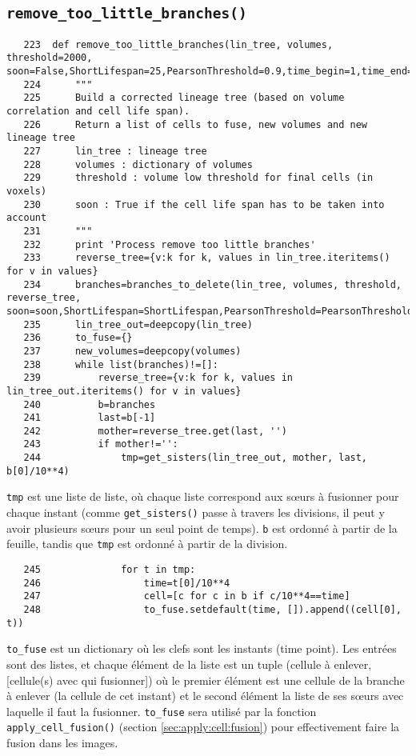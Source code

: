 \documentclass{article}
\def \mycolor {red}
\begin{document}
\subsection{\texttt{remove\_too\_little\_branches()}}
\label{sec:remove:too:little:branches}
\begin{verbatim} 
   223	def remove_too_little_branches(lin_tree, volumes, threshold=2000, soon=False,ShortLifespan=25,PearsonThreshold=0.9,time_begin=1,time_end=192):
   224	    """
   225	    Build a corrected lineage tree (based on volume correlation and cell life span).
   226	    Return a list of cells to fuse, new volumes and new lineage tree
   227	    lin_tree : lineage tree
   228	    volumes : dictionary of volumes
   229	    threshold : volume low threshold for final cells (in voxels)
   230	    soon : True if the cell life span has to be taken into account
   231	    """
   232	    print 'Process remove too little branches'
   233	    reverse_tree={v:k for k, values in lin_tree.iteritems() for v in values}
   234	    branches=branches_to_delete(lin_tree, volumes, threshold, reverse_tree, soon=soon,ShortLifespan=ShortLifespan,PearsonThreshold=PearsonThreshold,time_begin=time_begin,time_end=time_end)
   235	    lin_tree_out=deepcopy(lin_tree)
   236	    to_fuse={}
   237	    new_volumes=deepcopy(volumes)
   238	    while list(branches)!=[]:
   239	        reverse_tree={v:k for k, values in lin_tree_out.iteritems() for v in values}
   240	        b=branches
   241	        last=b[-1]
   242	        mother=reverse_tree.get(last, '')
   243	        if mother!='':
   244	            tmp=get_sisters(lin_tree_out, mother, last, b[0]/10**4)
\end{verbatim} 
\color{\mycolor}
\verb|tmp| est une liste de liste, o\`u chaque liste correspond aux s{\oe}urs \`a fusionner pour chaque instant (comme \verb|get_sisters()| passe \`a travers les divisions, il peut y avoir plusieurs s{\oe}urs pour un seul point de temps). \verb|b| est ordonn\'e \`a partir de la feuille, tandis que \verb|tmp| est ordonn\'e \`a partir de la division.
\color{black}
\begin{verbatim}
   245	            for t in tmp:
   246	                time=t[0]/10**4
   247	                cell=[c for c in b if c/10**4==time]
   248	                to_fuse.setdefault(time, []).append((cell[0], t))
\end{verbatim} 
\color{\mycolor}
\verb|to_fuse| est un dictionary o\`u les clefs sont les instants (time point). Les entr\'ees sont des listes, et chaque \'el\'ement de la liste est un tuple (cellule \`a enlever, [cellule(s) avec qui fusionner]) o\`u le premier \'el\'ement est une cellule de la branche \`a enlever (la cellule de cet instant) et le second \'el\'ement la liste de ses s{\oe}urs avec laquelle il faut la fusionner. \verb|to_fuse| sera utilis\'e par la fonction \verb|apply_cell_fusion()| (section \ref{sec:apply:cell:fusion}) pour effectivement faire la fusion dans les images.
\end{document}
